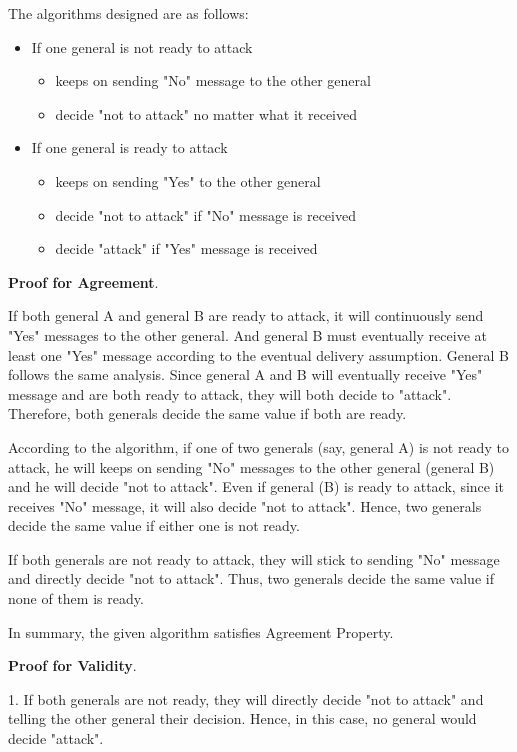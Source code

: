 \documentclass[11pt,a4paper]{article}
\begin{document}
The algorithms designed are as follows:
\begin{itemize}
    \item{If one general is not ready to attack}
        \begin{itemize}
        \item{keeps on sending "No" message to the other general}
        \item{decide "not to attack" no matter what it received}
        \end{itemize}
    \item{If one general is ready to attack}
        \begin{itemize}
        \item{keeps on sending "Yes" to the other general}
        \item{decide "not to attack" if "No" message is received}
        \item{decide "attack" if "Yes" message is received}
        \end{itemize}
\end{itemize}

\textbf{Proof for Agreement}. 

If both general A and general B are ready to attack, it will continuously send
"Yes" messages to the other general. And general B must eventually receive at
least one "Yes" message according to the eventual delivery assumption. General B
follows the same analysis. Since general A and B will eventually receive "Yes"
message and are both ready to attack, they will both decide to "attack".
Therefore, both generals decide the same value if both are ready.

According to the algorithm, if one of two generals (say, general A) is not
ready to attack, he will keeps on sending "No" messages to the other general
(general B) and he will decide "not to attack". Even if general (B) is ready
to attack, since it receives "No" message, it will also decide "not to
attack". Hence, two generals decide the same value if either one is not ready.

If both generals are not ready to attack, they will stick to sending "No"
message and directly decide "not to attack". Thus, two generals decide the
same value if none of them is ready.

In summary, the given algorithm satisfies Agreement Property.

\textbf{Proof for Validity}. 

1. If both generals are not ready, they will directly decide "not to attack"
and telling the other general their decision. Hence, in this case, no general
would decide "attack".
\end{document}

